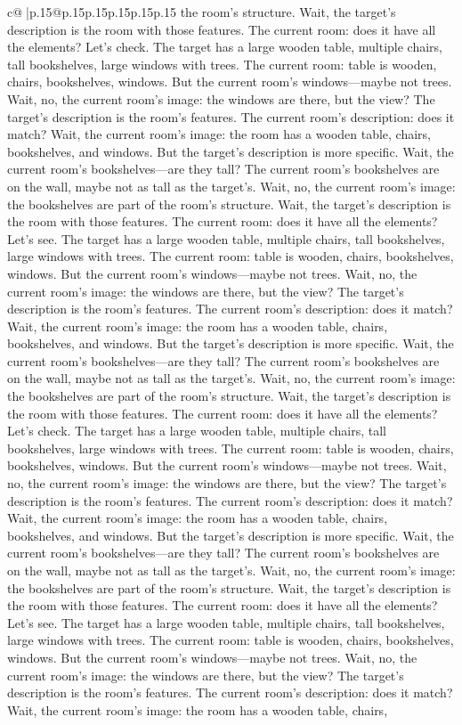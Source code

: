 \documentclass{article}
\begin{document}
{\begin{supertabular}{c@{$\;$}|p{.15\linewidth}@{}p{.15\linewidth}p{.15\linewidth}p{.15\linewidth}p{.15\linewidth}p{.15\linewidth}}
{{{the room's structure. Wait, the target's description is the room with those features. The current room: does it have all the elements? Let's check. The target has a large wooden table, multiple chairs, tall bookshelves, large windows with trees. The current room: table is wooden, chairs, bookshelves, windows. But the current room's windows—maybe not trees. Wait, no, the current room's image: the windows are there, but the view? The target's description is the room's features. The current room's description: does it match? Wait, the current room's image: the room has a wooden table, chairs, bookshelves, and windows. But the target's description is more specific. Wait, the current room's bookshelves—are they tall? The current room's bookshelves are on the wall, maybe not as tall as the target's. Wait, no, the current room's image: the bookshelves are part of the room's structure. Wait, the target's description is the room with those features. The current room: does it have all the elements? Let's see. The target has a large wooden table, multiple chairs, tall bookshelves, large windows with trees. The current room: table is wooden, chairs, bookshelves, windows. But the current room's windows—maybe not trees. Wait, no, the current room's image: the windows are there, but the view? The target's description is the room's features. The current room's description: does it match? Wait, the current room's image: the room has a wooden table, chairs, bookshelves, and windows. But the target's description is more specific. Wait, the current room's bookshelves—are they tall? The current room's bookshelves are on the wall, maybe not as tall as the target's. Wait, no, the current room's image: the bookshelves are part of the room's structure. Wait, the target's description is the room with those features. The current room: does it have all the elements? Let's check. The target has a large wooden table, multiple chairs, tall bookshelves, large windows with trees. The current room: table is wooden, chairs, bookshelves, windows. But the current room's windows—maybe not trees. Wait, no, the current room's image: the windows are there, but the view? The target's description is the room's features. The current room's description: does it match? Wait, the current room's image: the room has a wooden table, chairs, bookshelves, and windows. But the target's description is more specific. Wait, the current room's bookshelves—are they tall? The current room's bookshelves are on the wall, maybe not as tall as the target's. Wait, no, the current room's image: the bookshelves are part of the room's structure. Wait, the target's description is the room with those features. The current room: does it have all the elements? Let's see. The target has a large wooden table, multiple chairs, tall bookshelves, large windows with trees. The current room: table is wooden, chairs, bookshelves, windows. But the current room's windows—maybe not trees. Wait, no, the current room's image: the windows are there, but the view? The target's description is the room's features. The current room's description: does it match? Wait, the current room's image: the room has a wooden table, chairs, }}}
\end{supertabular}}
\end{document}
